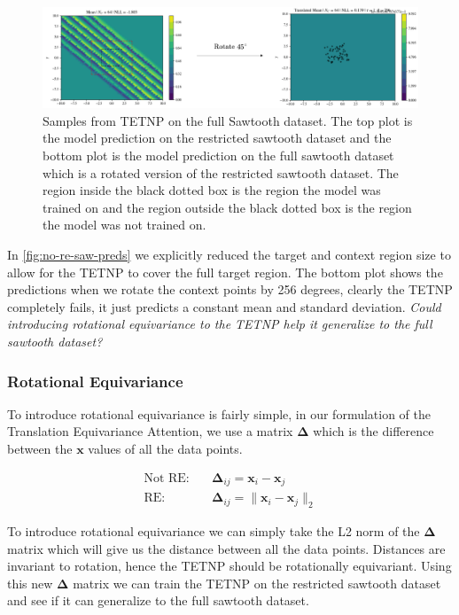 \documentclass[../../main.tex]{subfiles}
\begin{document}
\begin{figure}[H]
    \centering
    \includegraphics[width=1\linewidth]{./fig/res-saw/no-re.png}
    \caption{Samples from TETNP on the full Sawtooth dataset. The top plot is the model prediction on the restricted sawtooth dataset and the bottom plot is the model prediction on the full sawtooth dataset which is a rotated version of the restricted sawtooth dataset.
    The region inside the black dotted box is the region the model was trained on and the region outside the black dotted box is the region the model was not trained on.}
    \label{fig:no-re-saw-preds}
\end{figure}

In \autoref{fig:no-re-saw-preds} we explicitly reduced the target and context region size to allow for the TETNP to cover the full target region. The bottom plot shows the predictions when we rotate the context points by 256 degrees, clearly the TETNP completely fails, it just predicts a constant mean and standard deviation. \emph{Could introducing rotational equivariance to the TETNP help it generalize to the full sawtooth dataset?}

\subsubsection{Rotational Equivariance}

To introduce rotational equivariance is fairly simple, in our formulation of the Translation Equivariance Attention, we use a matrix $\bm{\Delta}$ which is the difference between the $\bm{x}$ values of all the data points.

\begin{align}
    \text{Not RE}: \quad &\bm{\Delta}_{ij} = \bm{x}_i - \bm{x}_j\\
    \text{RE}: \quad &\bm{\Delta}_{ij} = \|\bm{x}_i - \bm{x}_j\|_2
\end{align}

To introduce rotational equivariance we can simply take the L2 norm of the $\bm{\Delta}$ matrix which will give us the distance between all the data points. Distances are invariant to rotation, hence the TETNP should be rotationally equivariant. Using this new $\bm{\Delta}$ matrix we can train the TETNP on the restricted sawtooth dataset and see if it can generalize to the full sawtooth dataset.
\end{document}
